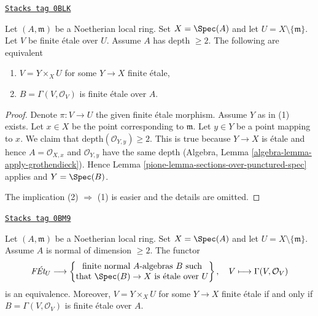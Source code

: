 \begin{lemma}
\label{pione-lemma-reformulate-purity}
\href{https://stacks.math.columbia.edu/tag/0BLK}{\texttt{Stacks tag 0BLK}}

Let $(A, \mathfrak m)$ be a Noetherian local ring. Set $X = \Spec(A)$
and let $U = X \setminus \{\mathfrak m\}$.
Let $V$ be finite \'etale
over $U$. Assume $A$ has depth $\geq 2$. The following are equivalent
\begin{enumerate}
\item $V = Y \times_X U$ for some $Y \to X$ finite \'etale,
\item $B = \Gamma(V, \mathcal{O}_V)$ is finite \'etale over $A$.
\end{enumerate}
\end{lemma}

\begin{proof}

Denote $\pi : V \to U$ the given finite \'etale morphism.
Assume $Y$ as in (1) exists. Let $x \in X$ be the point
corresponding to $\mathfrak m$.
Let $y \in Y$ be a point mapping to $x$. We claim that
$\text{depth}(\mathcal{O}_{Y, y}) \geq 2$.
This is true because $Y \to X$ is \'etale and hence
$A = \mathcal{O}_{X, x}$ and $\mathcal{O}_{Y, y}$ have
the same depth (Algebra, Lemma \ref{algebra-lemma-apply-grothendieck}).
Hence Lemma \ref{pione-lemma-sections-over-punctured-spec}
applies and $Y = \Spec(B)$.

\medskip\noindent
The implication (2) $\Rightarrow$ (1) is easier and the
details are omitted.
\end{proof}

\begin{lemma}
\label{pione-lemma-reformulate-purity-normal}
\href{https://stacks.math.columbia.edu/tag/0BM9}{\texttt{Stacks tag 0BM9}}

Let $(A, \mathfrak m)$ be a Noetherian local ring. Set $X = \Spec(A)$
and let $U = X \setminus \{\mathfrak m\}$. Assume $A$ is normal
of dimension $\geq 2$. The functor
$$
\textit{F\'Et}_U \longrightarrow
\left\{
\begin{matrix}
\text{finite normal }A\text{-algebras }B\text{ such} \\
\text{that }\Spec(B) \to X\text{ is \'etale over }U
\end{matrix}
\right\},
\quad
V \longmapsto \Gamma(V, \mathcal{O}_V)
$$
is an equivalence. Moreover, $V = Y \times_X U$ for some $Y \to X$
finite \'etale if and only if $B = \Gamma(V, \mathcal{O}_V)$
is finite \'etale over $A$.
\end{lemma}

